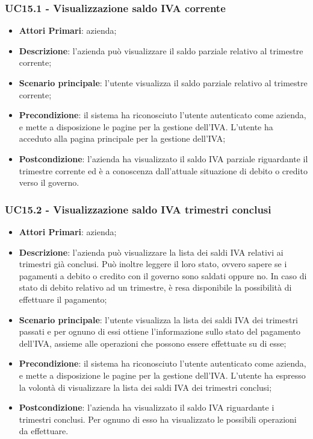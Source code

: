 \subsubsection{UC15.1 - Visualizzazione saldo IVA corrente}
\begin{itemize}
	\item \textbf{Attori Primari}: azienda;
	\item \textbf{Descrizione}: l'azienda può visualizzare il saldo parziale relativo al trimestre corrente;
	\item \textbf{Scenario principale}: l'utente visualizza il saldo parziale relativo al trimestre corrente;
	\item \textbf{Precondizione}: il sistema ha riconosciuto l'utente autenticato come azienda, e mette a disposizione le pagine per la gestione dell'IVA. L'utente ha acceduto alla pagina principale per la gestione dell'IVA; 
	\item \textbf{Postcondizione}: l'azienda ha visualizzato il saldo IVA parziale riguardante il trimestre corrente ed è a conoscenza dall'attuale situazione di debito o credito verso il governo.
\end{itemize} 

\subsubsection{UC15.2 - Visualizzazione saldo IVA trimestri conclusi}
\begin{itemize}
	\item \textbf{Attori Primari}: azienda;
	\item \textbf{Descrizione}: l'azienda può visualizzare la lista dei saldi IVA relativi ai trimestri già conclusi. Può inoltre leggere il loro stato, ovvero sapere se i pagamenti a debito o credito con il governo sono saldati oppure no. In caso di stato di debito relativo ad un trimestre, è resa disponibile la possibilità di effettuare il pagamento;
	\item \textbf{Scenario principale}: l'utente visualizza la lista dei saldi IVA dei trimestri passati e per ognuno di essi ottiene l'informazione sullo stato del pagamento dell'IVA, assieme alle operazioni che possono essere effettuate su di esse;
	\item \textbf{Precondizione}: il sistema ha riconosciuto l'utente autenticato come azienda, e mette a disposizione le pagine per la gestione dell'IVA. L'utente ha espresso la volontà di visualizzare la lista dei saldi IVA dei trimestri conclusi;
	\item \textbf{Postcondizione}: l'azienda ha visualizzato il saldo IVA riguardante i trimestri conclusi. Per ognuno di esso ha visualizzato le possibili operazioni da effettuare.
\end{itemize} 
